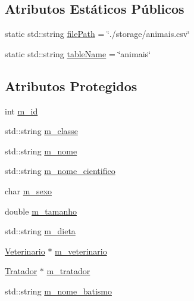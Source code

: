 \subsection*{Atributos Estáticos Públicos}
\begin{DoxyCompactItemize}
\item 
static std\+::string \hyperlink{classAnimal_a1e487e8b5e047f764f192a423e4d21ae}{file\+Path} = \char`\"{}./storage/animais.\+csv\char`\"{}
\item 
static std\+::string \hyperlink{classAnimal_a09d2d66762ed1fea5c6858d092b6ccb9}{table\+Name} = \char`\"{}animais\char`\"{}
\end{DoxyCompactItemize}
\subsection*{Atributos Protegidos}
\begin{DoxyCompactItemize}
\item 
int \hyperlink{classAnimal_a1a39448480e098fc74b5b67c4921a5ec}{m\+\_\+id}
\item 
std\+::string \hyperlink{classAnimal_a8a4d049b481ab0fe88015cde7557d281}{m\+\_\+classe}
\item 
std\+::string \hyperlink{classAnimal_adea60068908c590e8f92b2680023f8ce}{m\+\_\+nome}
\item 
std\+::string \hyperlink{classAnimal_af90a04b32166b6815617cfd4033da1e4}{m\+\_\+nome\+\_\+cientifico}
\item 
char \hyperlink{classAnimal_aaa6d77e661ed0fa9a33500588c8acfef}{m\+\_\+sexo}
\item 
double \hyperlink{classAnimal_afe83ba40e79b42d06b0c95f61aaa0218}{m\+\_\+tamanho}
\item 
std\+::string \hyperlink{classAnimal_af7ea074464d9a468f7412a2165afd553}{m\+\_\+dieta}
\item 
\hyperlink{classVeterinario}{Veterinario} $\ast$ \hyperlink{classAnimal_a3b95df9484483642a10cafcafc15961d}{m\+\_\+veterinario}
\item 
\hyperlink{classTratador}{Tratador} $\ast$ \hyperlink{classAnimal_a1d9b76d126f6d72374f94d4d359e0ea7}{m\+\_\+tratador}
\item 
std\+::string \hyperlink{classAnimal_aa9717b7e2de07af7118050ca1c10d0b5}{m\+\_\+nome\+\_\+batismo}
\end{DoxyCompactItemize}
